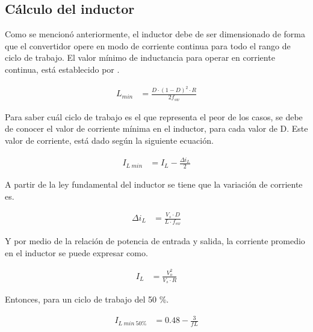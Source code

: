 \documentclass[conference]{IEEEtran}
\begin{document}
\subsection{Cálculo del inductor}
Como se mencionó anteriormente, el inductor debe de ser dimensionado de forma
que el convertidor opere en modo de corriente continua para todo el rango de
ciclo de trabajo. El valor mínimo de inductancia para operar en corriente
continua, está establecido por \cite{hart2011power}.

\begin{equation}
\begin{aligned}
    L_{min} &= \frac{D \cdot (1 - D)^2 \cdot R}{2f_{sw}}
\end{aligned}
\label{eq:inductancia_minima}
\end{equation}

Para saber cuál ciclo de trabajo es el que representa el peor de los casos, se debe de conocer
el valor de corriente mínima en el inductor, para cada valor de D. Este valor de corriente, está
dado según la siguiente ecuación.

\begin{equation}
\begin{aligned}
    I_{L~min} &= I_L - \frac{\Delta i_{L}}{2}
\end{aligned}
\label{eq:IL_min}
\end{equation}

A partir de la ley fundamental del inductor se tiene que la variación de corriente es.

\begin{equation}
\begin{aligned}
    \Delta i_{L} &= \frac{V_{s} \cdot D}{L \cdot f_{sw}}
\end{aligned}
\label{eq:delta_IL}
\end{equation}

Y por medio de la relación de potencia de entrada y salida, la corriente promedio
en el inductor se puede expresar como.

\begin{equation}
\begin{aligned}
    I_L &= \frac{V_o^2}{V_s \cdot R}
\end{aligned}
\label{eq:prom_IL}
\end{equation}

Entonces, para un ciclo de trabajo del 50 \%.

\begin{equation}
\begin{aligned}
    I_{L~min~50 \%} &= 0.48 - \frac{3}{fL}
\end{aligned}
\label{eq:IL_min_0.5}
\end{equation}
\end{document}
